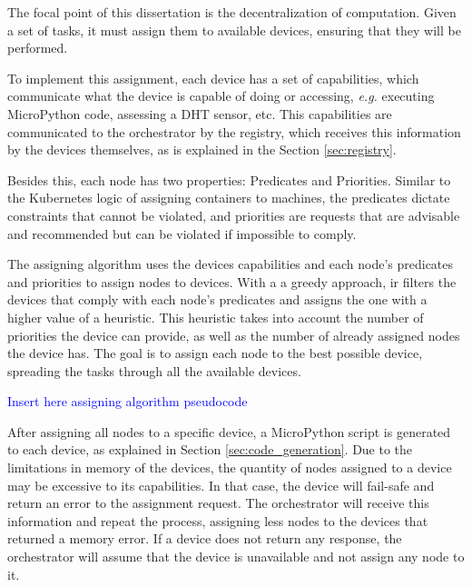 The focal point of this dissertation is the decentralization of computation. Given a set of tasks, it must assign them to available devices, ensuring that they will be performed.

To implement this assignment, each device has a set of capabilities, which communicate what the device is capable of doing or accessing, \textit{e.g.} executing MicroPython code, assessing a DHT sensor, etc. This capabilities are communicated to the orchestrator by the registry, which receives this information by the devices themselves, as is explained in the Section \ref{sec:registry}. 

Besides this, each node has two properties: Predicates and Priorities. Similar to the Kubernetes logic of assigning containers to machines, the predicates dictate constraints that cannot be violated, and priorities are requests that are advisable and recommended but can be violated if impossible to comply. 

The assigning algorithm uses the devices capabilities and each node's predicates and priorities to assign nodes to devices. With a a greedy approach, ir filters the devices that comply with each node's predicates and assigns the one with a higher value of a heuristic. This heuristic takes into account the number of priorities the device can provide, as well as the number of already assigned nodes the device has. The goal is to assign each node to the best possible device, spreading the tasks through all the available devices.

\textcolor{blue}{Insert here assigning algorithm pseudocode}

    
    

After assigning all nodes to a specific device, a MicroPython script is generated to each device, as explained in Section \ref{sec:code_generation}. Due to the limitations in memory of the devices, the quantity of nodes assigned to a device may be excessive to its capabilities. In that case, the device will fail-safe and return an error to the assignment request. The orchestrator will receive this information and repeat the process, assigning less nodes to the devices that returned a memory error. If a device does not return any response, the orchestrator will assume that the device is unavailable and not assign any node to it.

